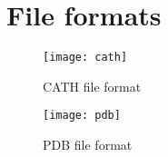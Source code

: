 \chapter{File formats}
\label{File formats}

\begin{figure}[htbp]
	\centering
	\texttt{[image: cath]}
	\caption{CATH file format}
\end{figure}

\begin{figure}[htbp]
	\centering
	\texttt{[image: pdb]}
	\caption{PDB file format}
\end{figure}